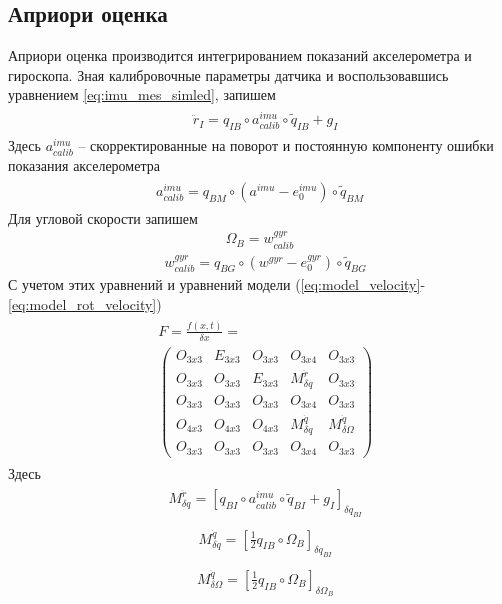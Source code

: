 \documentclass[a4paper,12pt]{article}
\begin{document}
\subsection{Априори оценка}
Априори оценка производится интегрированием показаний акселерометра и гироскопа.
Зная калибровочные параметры датчика и воспользовавшись уравнением \eqref{eq:imu_mes_simled}, запишем
\begin{align} \label{eq:rddot_i_calib}
\begin{split}
&\ddot{r}_{I} = {q}_{IB} \circ  a^{imu}_{calib} \circ \tilde{q}_{IB} + g_I
\end{split}
\end{align}
Здесь $a^{imu}_{calib}$ -- скорректированные на поворот и постоянную компоненту ошибки показания акселерометра
\begin{align} 
\begin{split}
a^{imu}_{calib} = q_{BM} \circ (a^{imu} - e^{imu}_0) \circ \tilde{q}_{BM}
\end{split}
\end{align}
Для угловой скорости запишем
\begin{align} 
\Omega_B = w^{\textit{gyr}}_{calib}
\end{align}
\begin{align} 
&w^{\textit{gyr}}_{calib} = q_{BG} \circ (w^{\textit{gyr}} - e_0^{\textit{gyr}}) \circ \tilde{q}_{BG}
\end{align}
С учетом этих уравнений и уравнений модели  (\ref{eq:model_velocity}-\ref{eq:model_rot_velocity})
\begin{align}
\begin{split}
&F = \frac{f(x,t)}{\delta x} = \\
&\begin{pmatrix}
O_{3x3} & E_{3x3} & O_{3x3} & O_{3x4} & O_{3x3}\\
O_{3x3} & O_{3x3} & E_{3x3} & M^{\ddot{r}}_{\delta q} & O_{3x3}\\
O_{3x3} & O_{3x3} & O_{3x3} & O_{3x4} & O_{3x3}\\
O_{4x3} & O_{4x3} & O_{4x3} & M^{\dot{q}}_{\delta q} & M^{\dot{q}}_{\delta \Omega}\\
O_{3x3} & O_{3x3} & O_{3x3} & O_{3x4} & O_{3x3}
\end{pmatrix}
\end{split}
\end{align}
Здесь
\begin{align}
\begin{split}
&M^{\ddot{r}}_{\delta q} = [q_{BI} \circ  a^{imu}_{calib} \circ \tilde{q}_{BI} + g_I]_{\delta q_{BI}}
\end{split}
\end{align}
\begin{align}
\begin{split}
&M^{\dot{q}}_{\delta q} = [\frac{1}{2} q_{IB} \circ \Omega_{B}]_{\delta q_{BI}}
\end{split}
\end{align}
\begin{align}
\begin{split}
&M^{\dot{q}}_{\delta \Omega} = [\frac{1}{2} q_{IB} \circ \Omega_{B}]_{\delta \Omega_B}
\end{split}
\end{align}
\end{document}
